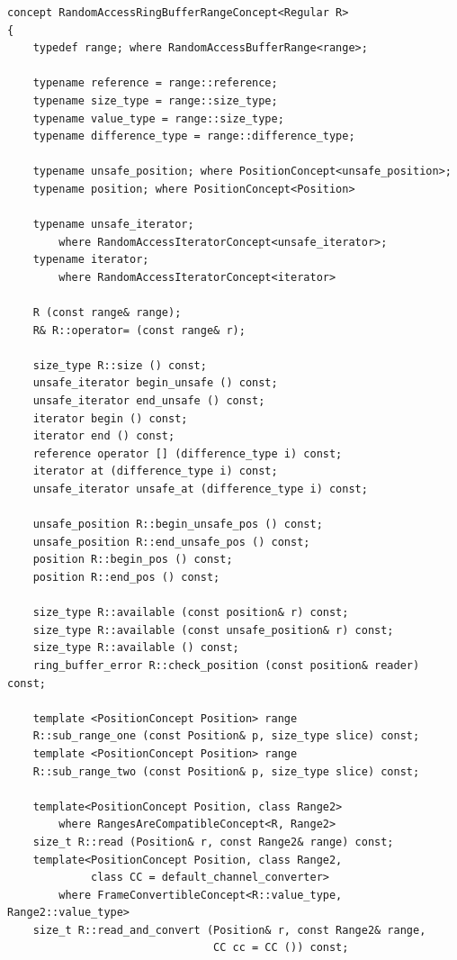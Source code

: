 %
%

\begin{lstlisting}
concept RandomAccessRingBufferRangeConcept<Regular R> 
{
    typedef range; where RandomAccessBufferRange<range>;

    typename reference = range::reference;
    typename size_type = range::size_type;
    typename value_type = range::size_type;
    typename difference_type = range::difference_type;
    
    typename unsafe_position; where PositionConcept<unsafe_position>;
    typename position; where PositionConcept<Position>

    typename unsafe_iterator; 
        where RandomAccessIteratorConcept<unsafe_iterator>;
    typename iterator;
        where RandomAccessIteratorConcept<iterator>
    
    R (const range& range);
    R& R::operator= (const range& r);

    size_type R::size () const;
    unsafe_iterator begin_unsafe () const;
    unsafe_iterator end_unsafe () const;
    iterator begin () const;
    iterator end () const;
    reference operator [] (difference_type i) const;    
    iterator at (difference_type i) const;
    unsafe_iterator unsafe_at (difference_type i) const;
    
    unsafe_position R::begin_unsafe_pos () const;
    unsafe_position R::end_unsafe_pos () const;
    position R::begin_pos () const;
    position R::end_pos () const;
    
    size_type R::available (const position& r) const;
    size_type R::available (const unsafe_position& r) const;    
    size_type R::available () const;
    ring_buffer_error R::check_position (const position& reader) const;

    template <PositionConcept Position> range
    R::sub_range_one (const Position& p, size_type slice) const;
    template <PositionConcept Position> range
    R::sub_range_two (const Position& p, size_type slice) const;
    
    template<PositionConcept Position, class Range2>
        where RangesAreCompatibleConcept<R, Range2>
    size_t R::read (Position& r, const Range2& range) const;
    template<PositionConcept Position, class Range2, 
             class CC = default_channel_converter>
        where FrameConvertibleConcept<R::value_type, Range2::value_type>
    size_t R::read_and_convert (Position& r, const Range2& range, 
                                CC cc = CC ()) const;
   

\end{lstlisting}
